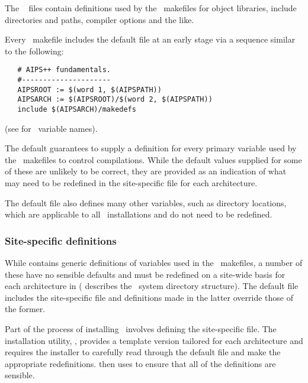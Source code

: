 The \aipspp\  files contain definitions used by the \aipspp\ 
makefiles for object libraries, include directories and paths, compiler
options and the like.

Every \aipspp\ makefile includes the default  file at an early
stage via a sequence similar to the following:

\begin{verbatim}
   # AIPS++ fundamentals.
   #---------------------
   AIPSROOT := $(word 1, $(AIPSPATH))
   AIPSARCH := $(AIPSROOT)/$(word 2, $(AIPSPATH))
   include $(AIPSARCH)/makedefs
\end{verbatim}

\noindent
(see  for \aipspp\ variable names).

The default  guarantees to supply a definition for every
primary variable used by the \aipspp\ makefiles to control compilations.
While the default values supplied for some of these are unlikely to be
correct, they are provided as an indication of what may need to be redefined
in the site-specific \file{makedefs} file for each architecture.

The default  file also defines many other variables, such as
directory locations, which are applicable to all \aipspp\ installations
and do not need to be redefined.

\subsubsection*{Site-specific definitions}

While  contains generic definitions of variables used
in the \aipspp\ makefiles, a number of these have no sensible defaults and
must be redefined on a site-wide basis for each architecture in
 ( describes the \aipspp\ 
system directory structure).  The default file includes the site-specific file
and definitions made in the latter override those of the former.

Part of the process of installing \aipspp\ involves defining the site-specific
 file.  The installation utility, ,
provides a template version tailored for each architecture and requires the
installer to carefully read through the default \file{makedefs} file and make
the appropriate redefinitions.  \aipsexe{configure} then uses 
to ensure that all of the definitions are sensible.


